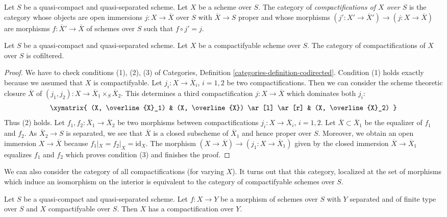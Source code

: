 \medskip\noindent
Let $S$ be a quasi-compact and quasi-separated scheme.
Let $X$ be a scheme over $S$. The category
of {\it compactifications of $X$ over $S$} is the category whose
objects are open immersions $j : X \to \overline{X}$ over $S$ with
$\overline{X} \to S$ proper and whose morphisms
$(j' : X' \to \overline{X}') \to (j : X \to \overline{X})$
are morphisms $f : \overline{X}' \to \overline{X}$ of schemes over $S$
such that $f \circ j' = j$.

\begin{lemma}
\label{lemma-compactifications-cofiltered}
Let $S$ be a quasi-compact and quasi-separated scheme.
Let $X$ be a compactifyable scheme over $S$.
The category of compactifications of $X$ over $S$ is
cofiltered.
\end{lemma}

\begin{proof}
We have to check conditions (1), (2), (3) of
Categories, Definition \ref{categories-definition-codirected}.
Condition (1) holds exactly because we assumed that $X$
is compactifyable.
Let $j_i : X \to \overline{X}_i$, $i = 1, 2$ be two compactifications.
Then we can consider the scheme theoretic closure $\overline{X}$
of $(j_1, j_2) : X \to \overline{X}_1 \times_S \overline{X}_2$.
This determines a third compactification $j : X \to \overline{X}$
which dominates both $j_i$:
$$
\xymatrix{
(X, \overline{X}_1) & (X, \overline{X}) \ar[l] \ar[r] & (X, \overline{X}_2)
}
$$
Thus (2) holds. Let $f_1, f_2 : \overline{X}_1 \to \overline{X}_2$
be two morphisms between compactifications
$j_i : X \to \overline{X}_i$, $i = 1, 2$.
Let $\overline{X} \subset \overline{X}_1$ be the equalizer of
$f_1$ and $f_2$. As $\overline{X}_2 \to S$ is separated, we see
that $\overline{X}$ is a closed subscheme of $\overline{X}_1$
and hence proper over $S$. Moreover, we obtain an
open immersion $X \to \overline{X}$ because $f_1|_X = f_2|_X = \text{id}_X$.
The morphism $(X \to \overline{X}) \to (j_1 : X \to \overline{X}_1)$
given by the closed immersion $\overline{X} \to \overline{X}_1$
equalizes $f_1$ and $f_2$ which proves condition (3) and
finishes the proof.
\end{proof}

\noindent
We can also consider the category of all compactifications (for varying $X$).
It turns out that this category, localized at the set of morphisms
which induce an isomorphism on the interior
is equivalent to the category of compactifyable schemes over $S$.

\begin{lemma}
\label{lemma-compactifyable}
Let $S$ be a quasi-compact and quasi-separated scheme. Let $f : X \to Y$
be a morphism of schemes over $S$ with $Y$ separated and of finite type
over $S$ and $X$ compactifyable over $S$. Then $X$ has a compactification
over $Y$.
\end{lemma}

